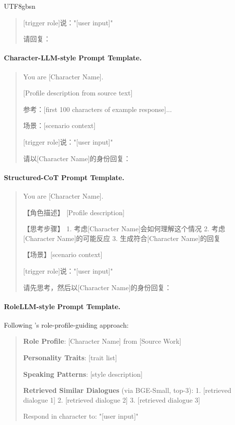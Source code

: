 \documentclass[11pt]{article}
\begin{document}
\begin{CJK*}{UTF8}{gbsn}
\begin{quote}
[trigger role]说："[user input]"

请回复：
\end{quote}

\paragraph{Character-LLM-style Prompt Template.}
\begin{quote}
\small
You are [Character Name].

[Profile description from source text]

参考：[first 100 characters of example response]...

场景：[scenario context]

[trigger role]说："[user input]"

请以[Character Name]的身份回复：
\end{quote}

\paragraph{Structured-CoT Prompt Template.}
\begin{quote}
\small
You are [Character Name].

【角色描述】
[Profile description]

【思考步骤】
1. 考虑[Character Name]会如何理解这个情况
2. 考虑[Character Name]的可能反应
3. 生成符合[Character Name]的回复

【场景】[scenario context]

[trigger role]说："[user input]"

请先思考，然后以[Character Name]的身份回复：
\end{quote}

\paragraph{RoleLLM-style Prompt Template.}
Following \citet{wang2024rolellm}'s role-profile-guiding approach:
\begin{quote}
\small
\textbf{Role Profile}: [Character Name] from [Source Work]

\textbf{Personality Traits}: [trait list]

\textbf{Speaking Patterns}: [style description]

\textbf{Retrieved Similar Dialogues} (via BGE-Small, top-3):
1. [retrieved dialogue 1]
2. [retrieved dialogue 2] 
3. [retrieved dialogue 3]

Respond in character to: "[user input]"
\end{quote}


\end{CJK*}
\end{document}
